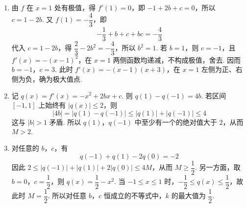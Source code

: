 \begin{solution}
\begin{enumerate}
\item 由 \(f\) 在 \(x=1\) 处有极值，得 \(f'(1)=0\)，即 \(-1+2b+c=0\)，所以 \(c=1-2b\). 又 \(f(1)=-\dfrac43\)，即
\[
-\frac13+b+c+bc=-\frac43
\]
代入 \(c=1-2b\)，得 \(\dfrac23-2b^2=-\dfrac43\)，所以 \(b^2=1\). 若 \(b=1\)，则 \(c=-1\)，且 \(f'(x)=-(x-1)^2\)，在 \(x=1\) 两侧函数均递减，不构成极值，舍去. 因而 \(b=-1\)，\(c=3\). 此时 \(f'(x)=-(x-1)(x+3)\)，在 \(x=1\) 左侧为正、右侧为负，确为极大值点.
\item 记 \(q(x)=f'(x)=-x^2+2bx+c\). 则 \(q(1)-q(-1)=4b\). 若区间 \([-1,1]\) 上始终有 \(|q(x)|\leq2\)，则
\[
|4b|=|q(1)-q(-1)|\leq|q(1)|+|q(-1)|\leq4
\]
这与 \(|b|>1\) 矛盾. 所以 \(q(1)\)，\(q(-1)\) 中至少有一个的绝对值大于 \(2\)，从而 \(M>2\).
\item 对任意的 \(b\)，\(c\)，有
\[
q(-1)+q(1)-2q(0)=-2
\]
因此 \(2\leq|q(-1)|+|q(1)|+2|q(0)|\leq4M\)，从而 \(M\geq\dfrac12\). 另一方面，取 \(b=0\)，\(c=\dfrac12\)，则 \(q(x)=\dfrac12-x^2\). 当 \(-1\leq x\leq1\) 时，\(-\dfrac12\leq q(x)\leq\dfrac12\)，故此时 \(M=\dfrac12\). 所以对任意 \(b\)，\(c\) 恒成立的不等式中，\(k\) 的最大值为 \(\dfrac12\).
\end{enumerate}
\end{solution}
